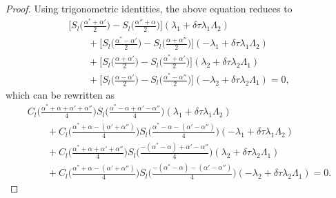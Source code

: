 \documentclass[10pt,a4paper]{amsart}
\numberwithin{equation}{section}
\begin{document}
\begin{proof}
Using trigonometric identities,
the above equation reduces to
\begin{gather*}
\biggl[S_l\biggl(\frac{\alpha^*+\alpha'}{2}\biggr) - S_l\biggl(\frac{\alpha''+\alpha}{2}\biggr) \biggr]
(\lambda_1 +\delta\tau\lambda_1\Lambda_2)\\
 \qquad{} +\biggl[S_l\biggl(\frac{\alpha^*-\alpha'}{2}\biggr) - S_l\biggl(\frac{\alpha+\alpha''}{2}\biggr) \biggr]
(-\lambda_1 +\delta\tau\lambda_1\Lambda_2) \\
 \qquad{} +\biggl[S_l\biggl(\frac{\alpha+\alpha'}{2}\biggr) - S_l\biggl(\frac{\alpha^*+\alpha'}{2}\biggr) \biggr]
(\lambda_2 +\delta\tau\lambda_2\Lambda_1)\\
 \qquad{} +\biggl[S_l\biggl(\frac{\alpha-\alpha'}{2}\biggr) - S_l\biggl(\frac{\alpha^*-\alpha''}{2}\biggr) \biggr]
(-\lambda_2 +\delta\tau\lambda_2\Lambda_1)=0,
\end{gather*}
 which can be rewritten as
 \begin{gather*}
 C_l\biggl(\frac{\alpha^*+\alpha+\alpha'+\alpha''}{4}\biggr) S_l\biggl(\frac{\alpha^*-\alpha+\alpha'-\alpha''}{4}\biggr) (\lambda_1 +\delta\tau\lambda_1\Lambda_2)\\
 \qquad{} + C_l\biggl(\frac{\alpha^*+\alpha-(\alpha'+\alpha'')}{4}\biggr) S_l\biggl(\frac{\alpha^*-\alpha-(\alpha'-\alpha'')}{4}\biggr) (-\lambda_1 +\delta\tau\lambda_1\Lambda_2)\\
 \qquad{} + C_l\biggl(\frac{\alpha^*+\alpha+\alpha'+\alpha''}{4}\biggr) S_l\biggl(\frac{-(\alpha^*-\alpha)+\alpha'-\alpha''}{4}\biggr) (\lambda_2 +\delta\tau\lambda_2\Lambda_1)\\
 \qquad{} + C_l\biggl(\frac{\alpha^*+\alpha-(\alpha'+\alpha'')}{4}\biggr) S_l\biggl(\frac{-(\alpha^*-\alpha)-(\alpha'-\alpha'')}{4}\biggr) (-\lambda_2 +\delta\tau\lambda_2\Lambda_1)=0.
 \end{gather*}


\end{proof}
\end{document}
